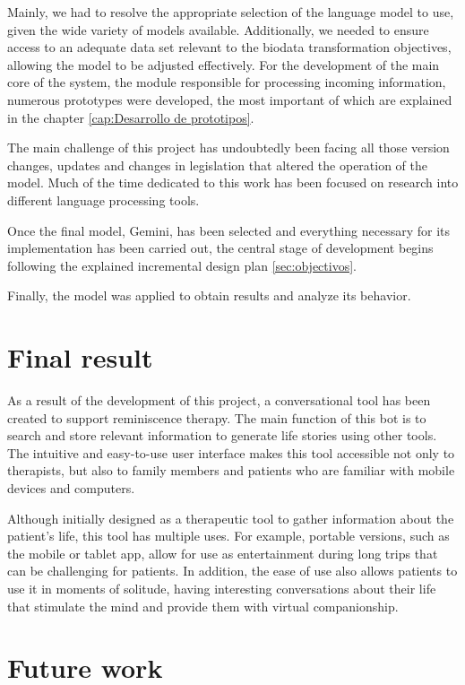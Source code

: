 Mainly, we had to resolve the appropriate selection of the language model to use, given the wide variety of models available. Additionally, we needed to ensure access to an adequate data set relevant to the biodata transformation objectives, allowing the model to be adjusted effectively.
For the development of the main core of the system, the module responsible for processing incoming information, numerous prototypes were developed, the most important of which are explained in the chapter \ref{cap:Desarrollo de prototipos}.

The main challenge of this project has undoubtedly been facing all those version changes, updates and changes in legislation that altered the operation of the model. Much of the time dedicated to this work has been focused on research into different language processing tools.

Once the final model, Gemini, has been selected and everything necessary for its implementation has been carried out, the central stage of development begins following the explained incremental design plan \ref{sec:objectivos}.

Finally, the model was applied to obtain results and analyze its behavior.


\section{Final result}
As a result of the development of this project, a conversational tool has been created to support reminiscence therapy. The main function of this bot is to search and store relevant information to generate life stories using other tools. The intuitive and easy-to-use user interface makes this tool accessible not only to therapists, but also to family members and patients who are familiar with mobile devices and computers.

Although initially designed as a therapeutic tool to gather information about the patient's life, this tool has multiple uses. For example, portable versions, such as the mobile or tablet app, allow for use as entertainment during long trips that can be challenging for patients. In addition, the ease of use also allows patients to use it in moments of solitude, having interesting conversations about their life that stimulate the mind and provide them with virtual companionship.

\section{Future work}

